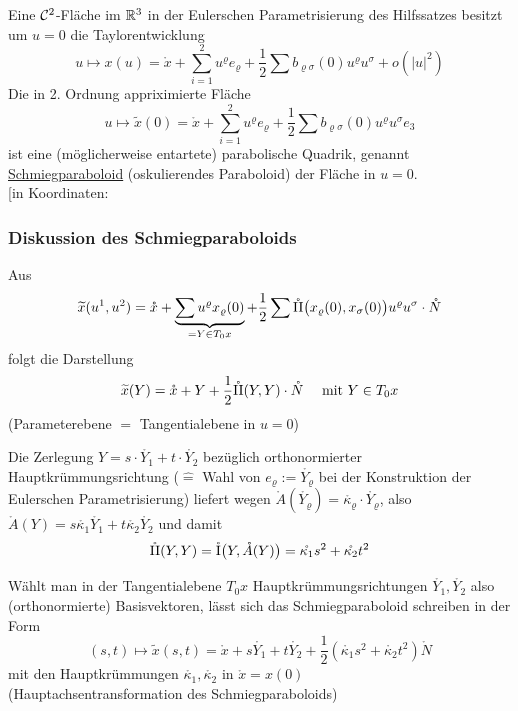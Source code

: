 \begin{satz}\label{satz233}
 Eine \(\mathcal{C}^2\)-Fläche im \(\mathbb{R}^3\) in der Eulerschen Parametrisierung des Hilfssatzes besitzt um \(u = 0\) die Taylorentwicklung
 \[
  u \mapsto x(u) = \mathring x + \sum_{i=1}^2 u^\varrho e_\varrho + \frac12 \sum b_{\varrho \sigma}(0) u^\varrho u^\sigma + o\left(|u|^2\right)
 \]
 Die in 2. Ordnung appriximierte Fläche
 \[
  u \mapsto \widetilde x(0) = \mathring x + \sum_{i=1}^2 u^\varrho e_\varrho + \frac12 \sum b_{\varrho \sigma}(0) u^\varrho u^\sigma e_3
 \]
 ist eine (möglicherweise entartete) parabolische Quadrik, genannt \uline{Schmiegparaboloid} (oskulierendes Paraboloid) der Fläche in \(u = 0\). \\
 {\Huge[}in Koordinaten: \mat{2x^3 = \sum_{\varrho, \sigma = 1}^2 b_{\varrho \sigma}(0) x^\varrho x^\sigma}{\Huge]}
\end{satz}

\subsubsection*{Diskussion des Schmiegparaboloids}
Aus 
\begin{align*}
 \widetilde x(u^1, u^2) = \mathring x + \underbrace{\sum u^\varrho x_\varrho (0)}_{= Y \in T_0 x} + \frac12 \sum \mathring {\Rom2} \big( x_\varrho(0), x_\sigma(0)\big) u^\varrho u^\sigma \cdot \mathring N
\end{align*}
folgt die Darstellung
\begin{align*}
 \widetilde x(Y) = \mathring x + Y + \frac12\mathring {\Rom2}(Y,Y) \cdot \mathring N \quad \text{ mit } Y \in T_0 x
\end{align*}
(Parameterebene \(=\) Tangentialebene in \(u = 0\)) \par
Die Zerlegung \(Y = s \cdot \mathring{Y_1} + t \cdot \mathring{Y_2}\) bezüglich orthonormierter Hauptkrümmungsrichtung (\(\widehat=\) Wahl von \(e_\varrho := \mathring{Y_\varrho}\) bei der Konstruktion der Eulerschen Parametrisierung) liefert wegen \(\mathring A \left(\mathring{Y_\varrho}\right) = \mathring {\kappa_\varrho} \cdot \mathring{Y_\varrho}\), also \(\mathring A(Y) = s \mathring{\kappa_1} \mathring {Y_1} + t \mathring{\kappa_2} \mathring {Y_2}\) und damit
\[
 \mathring {\Rom2} (Y,Y) = \mathring {\Rom1}\big(Y, \mathring A(Y)\big) = \mathring {\kappa_1} s^2 + \mathring {\kappa_2} t^2
\]

\begin{folgerung}
 Wählt man in der Tangentialebene \(T_0x\) Hauptkrümmungsrichtungen \(\mathring {Y_1}, \mathring{Y_2}\) also (orthonormierte) Basisvektoren, lässt sich das Schmiegparaboloid schreiben in der Form
 \[
  (s,t) \mapsto \widetilde x(s,t) = \mathring x + s \mathring {Y_1} + t \mathring {Y_2} + \frac12 \left( \mathring {\kappa_1}s^2 + \mathring {\kappa_2} t^2 \right) \mathring N
 \]
 mit den Hauptkrümmungen \(\mathring {\kappa_1}, \mathring {\kappa_2}\) in \(\mathring x = x(0)\) \\(Hauptachsentransformation des Schmiegparaboloids) \\
 \big[ "`\(z = \frac12 \left( \mathring {\kappa_1} x^2 + \mathring {\kappa_2} y^2 \right)\)"' \big]
\end{folgerung}

